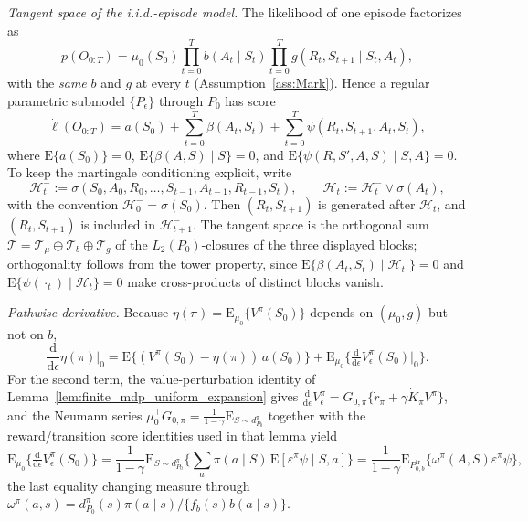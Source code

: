 \documentclass[12pt]{article}
\theoremstyle{remark}\newtheorem{remark}[theorem]{Remark}\theoremstyle{plain}
\newcommand{\E}{\mathrm{E}}
\begin{document}
\emph{Tangent space of the i.i.d.-episode model.}
The likelihood of one episode factorizes as
\[
    p(O_{0:T})
    =\mu_0(S_0)\prod_{t=0}^{T}b(A_t\mid S_t)
     \prod_{t=0}^{T}g(R_t,S_{t+1}\mid S_t,A_t),
\]
with the \emph{same} $b$ and $g$ at every $t$
(Assumption~\ref{ass:Mark}).  Hence a regular parametric submodel
$\{P_\epsilon\}$ through $P_0$ has score
\[
    \dot\ell(O_{0:T})
    =a(S_0)+\sum_{t=0}^{T}\beta(A_t,S_t)
    +\sum_{t=0}^{T}\psi(R_t,S_{t+1},A_t,S_t),
\]
where $\E\{a(S_0)\}=0$, $\E\{\beta(A,S)\mid S\}=0$, and
$\E\{\psi(R,S',A,S)\mid S,A\}=0$.  To keep the martingale
conditioning explicit, write
\[
    \mathcal H_t^-:=
    \sigma(S_0,A_0,R_0,\ldots,S_{t-1},A_{t-1},R_{t-1},S_t),
    \qquad
    \mathcal H_t:=\mathcal H_t^-\vee\sigma(A_t),
\]
with the convention $\mathcal H_0^-=\sigma(S_0)$.  Then
$(R_t,S_{t+1})$ is generated after $\mathcal H_t$, and
$(R_t,S_{t+1})$ is included in $\mathcal H_{t+1}^-$.  The tangent space is the
orthogonal sum
$\mathcal T=\mathcal T_\mu\oplus\mathcal T_b\oplus\mathcal T_g$ of the
$L_2(P_0)$-closures of the three displayed blocks; orthogonality follows
from the tower property, since
$\E\{\beta(A_t,S_t)\mid\mathcal H_t^{-}\}=0$ and
$\E\{\psi(\cdot_t)\mid\mathcal H_t\}=0$ make cross-products of distinct
blocks vanish.

\emph{Pathwise derivative.}
Because $\eta(\pi)=\E_{\mu_0}\{V^\pi(S_0)\}$ depends on $(\mu_0,g)$ but
not on $b$,
\[
    \frac{\mathrm d}{\mathrm d\epsilon}\eta(\pi)\Big|_{0}
    =\E\{(V^\pi(S_0)-\eta(\pi))\,a(S_0)\}
    +\E_{\mu_0}\Big\{\tfrac{\mathrm d}{\mathrm d\epsilon}
    V^\pi_\epsilon(S_0)\Big|_0\Big\}.
\]
For the second term, the value-perturbation identity of
Lemma~\ref{lem:finite_mdp_uniform_expansion} gives
$\tfrac{\mathrm d}{\mathrm d\epsilon}V^\pi_\epsilon
=G_{0,\pi}\{\dot r_\pi+\gamma\dot K_\pi V^\pi\}$, and the Neumann series
$\mu_0^\top G_{0,\pi}=\frac1{1-\gamma}\E_{S\sim d_{P_0}^\pi}$ together
with the reward/transition score identities used in that lemma yield
\[
    \E_{\mu_0}\Big\{\tfrac{\mathrm d}{\mathrm d\epsilon}
    V^\pi_\epsilon(S_0)\Big\}
    =\frac1{1-\gamma}\E_{S\sim d_{P_0}^\pi}
    \Big\{\sum_a\pi(a\mid S)\,\E[\varepsilon^\pi\psi\mid S,a]\Big\}
    =\frac1{1-\gamma}
    \E_{P_{0,b}^{\mathrm{tr}}}\{\omega^\pi(A,S)\varepsilon^\pi\psi\},
\]
the last equality changing measure through
$\omega^\pi(a,s)=d_{P_0}^\pi(s)\pi(a\mid s)/\{f_b(s)b(a\mid s)\}$.
\end{document}
